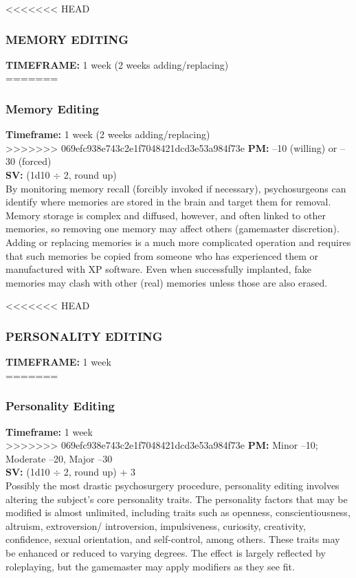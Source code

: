 <<<<<<< HEAD
\subsubsection{MEMORY EDITING}
\textbf{TIMEFRAME:} 1 week (2 weeks adding/replacing) \\
=======
\subsubsection{Memory Editing}
\textbf{Timeframe:} 1 week (2 weeks adding/replacing) \\
>>>>>>> 069efc938e743c2e1f7048421dcd3e53a984f73e
\textbf{PM:} –10 (willing) or –30 (forced) \\
\textbf{SV:} (1d10 $\div$ 2, round up) \\
By monitoring memory recall (forcibly invoked if necessary),
psychosurgeons can identify where memories
are stored in the brain and target them for removal.
Memory storage is complex and diffused, however,
and often linked to other memories, so removing one
memory may affect others (gamemaster discretion).
Adding or replacing memories is a much more complicated
operation and requires that such memories be
copied from someone who has experienced them or
manufactured with XP software. Even when successfully
implanted, fake memories may clash with other
(real) memories unless those are also erased.

<<<<<<< HEAD
\subsubsection{PERSONALITY EDITING}
\textbf{TIMEFRAME:} 1 week \\
=======
\subsubsection{Personality Editing}
\textbf{Timeframe:} 1 week \\
>>>>>>> 069efc938e743c2e1f7048421dcd3e53a984f73e
\textbf{PM:} Minor –10; Moderate –20, Major –30 \\
\textbf{SV:} (1d10 $\div$ 2, round up) + 3 \\
Possibly the most drastic psychosurgery procedure,
personality editing involves altering the subject’s core
personality traits. The personality factors that may be
modified is almost unlimited, including traits such as
openness, conscientiousness, altruism, extroversion/
introversion, impulsiveness, curiosity, creativity, confidence, sexual orientation, and self-control, among
others. These traits may be enhanced or reduced to
varying degrees. The effect is largely reflected by roleplaying,
but the gamemaster may apply modifiers as
they see fit.

